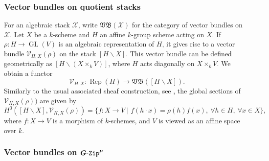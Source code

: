 \documentclass[11pt]{amsart}
\numberwithin{equation}{section}
\theoremstyle{definition}
\theoremstyle{remark}
\newcommand{\GZip}{\mathop{\text{$G$-{\tt Zip}}}\nolimits}
\newcommand{\VB}{\mathfrak{VB}}
\newcommand{\Vcal}{{\mathcal V}}
\newcommand{\Xcal}{{\mathcal X}}
\DeclareMathOperator{\Rep}{Rep}
\DeclareMathOperator{\GL}{GL}
\newcommand{\lra}{\longrightarrow}
\begin{document}
\subsubsection{Vector bundles on quotient stacks} \label{sec-genth-vb}
For an algebraic stack $\Xcal$, write $\VB(\Xcal)$ for the category of vector bundles on $\Xcal$. Let $X$ be a $k$-scheme and $H$ an affine $k$-group scheme acting on $X$. If $\rho \colon H\to \GL(V)$ is an algebraic representation of $H$, it gives rise to a vector bundle $\Vcal_{H,X}(\rho)$ on the stack $[H\backslash X]$. This vector bundle can be defined geometrically as $[H\backslash (X\times_k V)]$, where $H$ acts diagonally on $X\times_k V$. We obtain a functor
\begin{equation}\label{funct-rep}
    \Vcal_{H,X} \colon \Rep(H)\lra \VB([H\backslash X]).
\end{equation}
Similarly to the usual associated sheaf construction, see \cite[Section~5.8, Equation (1)]{jantzen-representations}, the global sections of $\Vcal_{H,X}(\rho))$ are given by
\begin{equation}\label{globquot}
 H^0([H\backslash X],\Vcal_{H,X}(\rho))
 =\{f \colon X\to V \mid  f(h \cdot x)=\rho(h) f(x) , \  \forall h\in H, \ \forall x\in X\},
\end{equation}
where $f\colon X\to V$ is a morphism of $k$-schemes, and $V$ is viewed as an affine space over $k$.

\subsubsection{Vector bundles on \texorpdfstring{$\boldsymbol{\GZip^\mu}$}{GZip\textasciicircum\{mu\}}} \label{sec-VB-Gzip}
\end{document}
